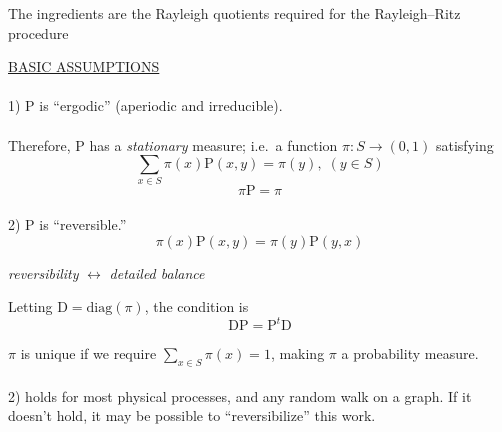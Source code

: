 \documentclass{slides}
\newcommand{\D}{\mbox{D}}
\newcommand{\Prob}{\mbox{P}}
\begin{document}
\begin{note}
The ingredients are the Rayleigh quotients required for the 
Rayleigh--Ritz procedure
\end{note}


\begin{slide}
\underline{BASIC ASSUMPTIONS}\\\\
1) P is ``ergodic'' (aperiodic and irreducible).
\\\\
Therefore, P has a \emph{stationary} measure;
i.e.~a function $\pi : S \rightarrow (0,1)$ satisfying
\[\sum_{x \in S} \pi(x) \Prob(x,y) = \pi(y), \; (y \in S) \]
\[\pi \Prob = \pi\]
\\
2) P is ``reversible.''
        \begin{equation}  \pi(x) \Prob(x,y) = \pi(y) \Prob(y,x)
\end{equation}
\begin{center}
{\it reversibility} $\leftrightarrow$ {\it detailed balance}
\end{center}

Letting $\D = \mbox{diag}(\pi)$, the condition is
        \begin{equation}
        \label{eqn:reversible}
        \D \Prob = \Prob^t \D
        \end{equation}
\end{slide}

\begin{note}
$\pi$ is unique if we require $\sum_{x \in S} \pi(x) = 1$, 
making $\pi$ a probability measure.
\\\\
2) holds for most physical processes, and any random walk on a
   graph.  If it doesn't hold, it may be possible to ``reversibilize''
   this work.
\end{note}
\end{document}
